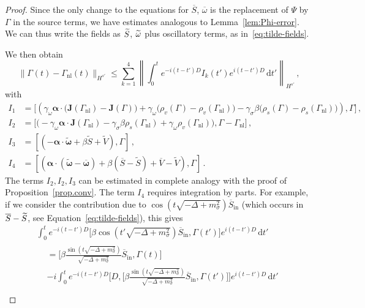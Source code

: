 \documentclass[10pt]{amsart}
\theoremstyle{definition}\newtheorem{defi}[theo]{Definition}\newtheorem{rema}[theo]{Remark}\newtheorem{exam}[theo]{Example}\newtheorem{exem}[theo]{Example}\newtheorem{nota}[theo]{Notation}
\newcommand{\rmin}{\mathrm{in}}
\newcommand{\nl}{\mathrm{nl}}
\renewcommand\tilde{\widetilde}
\renewcommand\d[1]{{\ensuremath{\,\text{d}#1}}}
\let\oldtilde\tilde
\renewcommand*{\tilde}[1]{\mathchoice{\widetilde{#1}}{\widetilde{#1}}{\oldtilde{#1}}{\oldtilde{#1}}}
\begin{document}
\begin{proof}
Since the only change to the equations for $\overline{S}$, $\overline{\omega}$ is the replacement of $\Psi$ by $\Gamma$ in the source terms, we have estimates analogous to Lemma~\ref{lem:Phi-error}. We can thus write the fields as $\tilde S$, $\tilde \omega$ plus oscillatory terms, as in~\eqref{eq:tilde-fields}.

We then obtain
\begin{equation}\label{eq:Gamma diff}
\|\Gamma_{}(t) -\Gamma_{\nl}(t) \|_{H^{s'}}\leq \sum_{k=1}^4\left\|\int_0^te^{-i(t-t')D}I_k (t')e^{i(t-t')D}\d t'\right\|_{H^{s'}}\,,
\end{equation}
with
\begin{align*}
I_1&= \Big[\left(
\gamma_\omega {\bm\alpha}\cdot \big({\bm J}(\Gamma_\nl) -{\bm J}(\Gamma)\big) +\gamma_\omega\big(\rho_v(\Gamma) - \rho_v(\Gamma_{\nl})\big) -\gamma_\sigma \beta\big(\rho_s(\Gamma) - \rho_s(\Gamma_{\nl})\big)
\right),\Gamma\Big]\,,\\
I_2&= \Big[\big(-\gamma_\omega{\bm\alpha}\cdot {\bm J}(\Gamma_\nl)-\gamma_\sigma\beta \rho_s(\Gamma_{\nl})+\gamma_\omega\rho_v(\Gamma_{\nl})\big),\Gamma-\Gamma_\nl \Big] \,,
\\
I_3&=
\left[\left(-\bm\alpha\cdot \widetilde{\bm \omega}+\beta \widetilde{S}+\widetilde{V}\right),\Gamma\right]\,,
\\
I_4&=\left[\left(\bm\alpha\cdot (\widetilde{\bm \omega}-\overline{{\bm \omega}})+\beta(\overline{S}-\widetilde{S})+\overline{V}-\widetilde{V}\right),\Gamma\right]\,.
\end{align*}
The terms $I_2, I_2, I_3$ can be estimated in complete analogy with the proof of Proposition~\ref{prop.conv}. The term $I_4$ requires integration by parts. For example, if we consider the contribution due to $\cos(t\sqrt{-\Delta + m^2_\sigma})\overline{S}_\rmin$ (which occurs in $\overline{S}-\tilde S$, see Equation~\eqref{eq:tilde-fields}), this gives
\begin{multline*}
\int_0^t e^{-i(t-t')D}\Big[\beta \cos\left(t'\sqrt{-\Delta + m^2_\sigma}\right)\overline{S}_\rmin, \Gamma(t')\Big]e^{i(t-t')D}\d t'\\
\begin{aligned}
&= \Big[\beta \frac{\sin\left(t\sqrt{-\Delta + m^2_\sigma}\right)}{\sqrt{-\Delta + m^2_\sigma}} \overline{S}_\rmin, \Gamma(t) \Big] \\
&- i\int_0^t e^{-i(t-t')D}\Big[D,\Big[\beta \frac{\sin\left(t\sqrt{-\Delta + m^2_\sigma}\right)}{\sqrt{-\Delta + m^2_\sigma}}\overline{S}_\rmin, \Gamma(t')\Big]\Big]e^{i(t-t')D}\d t' \\

\end{aligned}
\end{multline*}
\end{proof}
\end{document}
